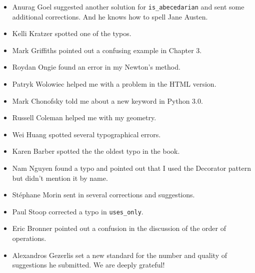 \begin{itemize}
\item Anurag Goel suggested another solution for \verb"is_abecedarian"
and sent some additional corrections.  And he knows how to
spell Jane Austen.

\item Kelli Kratzer spotted one of the typos.

\item Mark Griffiths pointed out a confusing example in Chapter 3.

\item Roydan Ongie found an error in my Newton's method.

\item Patryk Wolowiec helped me with a problem in the HTML version.

\item Mark Chonofsky told me about a new keyword in Python 3.0.

\item Russell Coleman helped me with my geometry.

\item Wei Huang spotted several typographical errors.

\item Karen Barber spotted the the oldest typo in the book.

\item Nam Nguyen found a typo and pointed out that I used the Decorator
pattern but didn't mention it by name.

\item St\'{e}phane Morin sent in several corrections and suggestions.

\item Paul Stoop corrected a typo in \verb+uses_only+.

\item Eric Bronner pointed out a confusion in the discussion of the
order of operations.

\item Alexandros Gezerlis set a new standard for the number and
quality of suggestions he submitted.  We are deeply grateful!


\end{itemize}


\normalsize
\clearemptydoublepage

\begin{latexonly}

\tableofcontents

\clearemptydoublepage

\end{latexonly}
